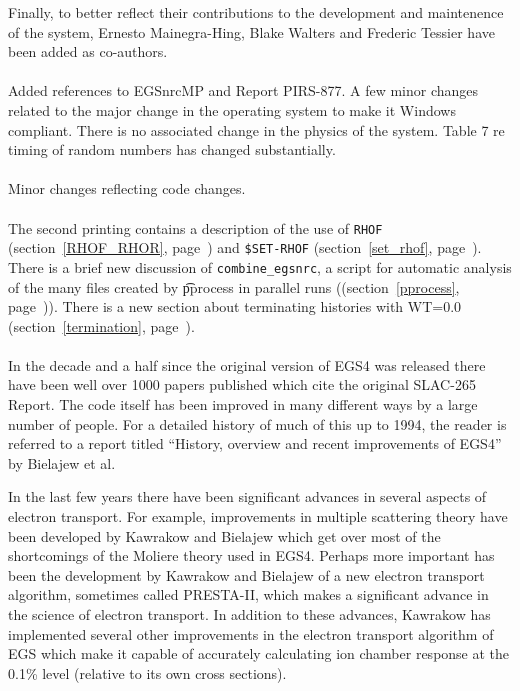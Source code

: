 Finally, to better reflect their contributions
to the development and maintenence of the system, Ernesto Mainegra-Hing,
Blake Walters and Frederic Tessier have been added as co-authors.
\vspace{3mm}\\
\\
Added references to EGSnrcMP and Report PIRS-877. A few minor changes
related to the major change in the operating system to make it Windows
compliant. There is no associated change in the physics of the system.
Table 7 re timing of random numbers has changed substantially.
\vspace{3mm}\\
\\
Minor changes reflecting code changes.
\vspace{3mm}\\
\\
The second printing contains a description of the use of {\tt RHOF}
(section~\ref{RHOF_RHOR}, page~\pageref{RHOF_RHOR}) and {\tt \$SET-RHOF}
(section~\ref{set_rhof}, page~\pageref{set_rhof}). There is a brief new
discussion of {\tt combine\_egsnrc}, a script for automatic analysis of the
many files created by {\t pprocess} in parallel runs
((section~\ref{pprocess}, page~\pageref{pprocess})). There is a new section
about terminating histories with WT=0.0 (section~\ref{termination},
page~\pageref{termination}).
\vspace{3mm}\\
\\
In the decade and a half since the original version of EGS4 was released
there have been well over 1000 papers published which cite the original
SLAC-265 Report.  The code itself has been improved in many different ways
by a large number of people.  For a detailed history of much of this up to
1994, the reader is referred to a report titled  ``History, overview and
recent improvements of EGS4'' by Bielajew et al.

In the last few years there have been significant advances in several
aspects of electron transport.  For example, improvements in multiple scattering
theory have been developed by Kawrakow and Bielajew\cite{KB97,Bi96,Ka96}
which get over most of
the shortcomings of the Moliere theory used in EGS4. Perhaps more important
has been the development by Kawrakow and Bielajew\cite{KB97a} of a new electron transport algorithm, sometimes
called PRESTA-II, which makes a significant advance in the science of
electron transport.  In addition to these advances, Kawrakow has implemented
several other improvements in the electron transport algorithm of EGS
which make it capable of accurately calculating ion chamber response at the
0.1\% level (relative to its own cross sections)\cite{Ka99a,Ka99b}.

